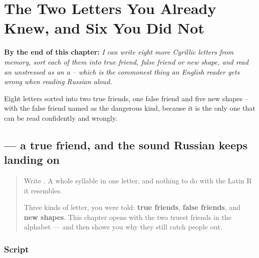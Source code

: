 
\chapter{The Two Letters You Already Knew, and Six You Did Not}
\label{ch:ru-script-eight}

\begin{chapteropening}
\textbf{By the end of this chapter:} \emph{I can write eight more Cyrillic letters from memory, sort each of them into true friend, false friend or new shape, and read an unstressed  as an a -- which is the commonest thing an English reader gets wrong when reading Russian aloud.}

Eight letters sorted into two true friends, one false friend and five new shapes -- with the false friend named as the dangerous kind, because it is the only one that can be read confidently and wrongly.
\end{chapteropening}

\section[\texorpdfstring{\ru{а} (a)}{а (a)}]{ — a true friend, and the sound Russian keeps landing on}

\label{lesson:RU-W07-a}



\begin{quote}
Write . A whole syllable in one letter, and nothing to do with the Latin R it resembles.

Three kinds of letter, you were told: \textbf{true friends}, \textbf{false friends}, and \textbf{new shapes}. This chapter opens with the two truest friends in the alphabet — and then shows you why they still catch people out.
\end{quote}

\subsection*{Script}

\begin{quote}
   
\end{quote}

